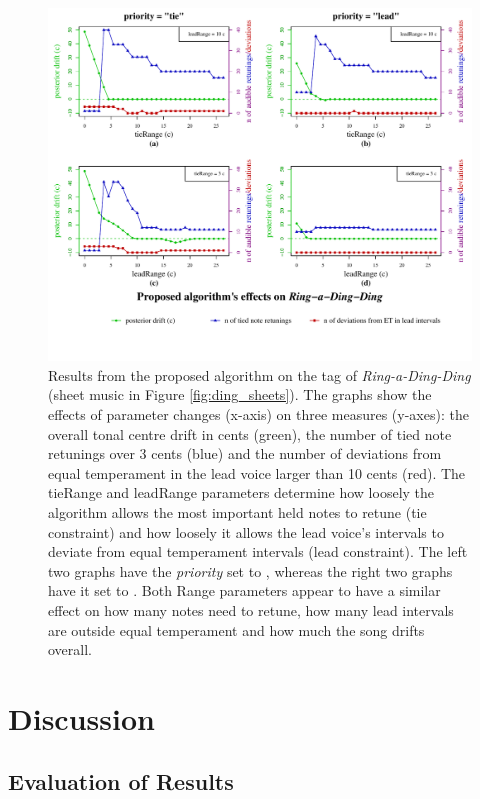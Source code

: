\documentclass[a4paper]{article}
\begin{document}
\begin{figure}
	\centering
	\includegraphics[width=\linewidth]{Results/effects_ring.pdf}
	\caption{Results from the proposed algorithm on the tag of \textit{Ring-a-Ding-Ding} (sheet music in Figure \ref{fig:ding_sheets}). The graphs show the effects of parameter changes (x-axis) on three measures (y-axes): the overall tonal centre drift in cents (green), the number of tied note retunings over 3 cents (blue) and the number of deviations from equal temperament in the lead voice larger than 10 cents (red). The tieRange and leadRange parameters determine how loosely the algorithm allows the most important held notes to retune (tie constraint) and how loosely it allows the lead voice's intervals to deviate from equal temperament intervals (lead constraint). The left two graphs have the \textit{priority} set to , whereas the right two graphs have it set to . Both Range parameters appear to have a similar effect on how many notes need to retune, how many lead intervals are outside equal temperament and how much the song drifts overall.}
	\label{fig:results}
\end{figure}

\section{Discussion}
\label{discussion}
\subsection{Evaluation of Results}
\label{disc_results}
\end{document}
